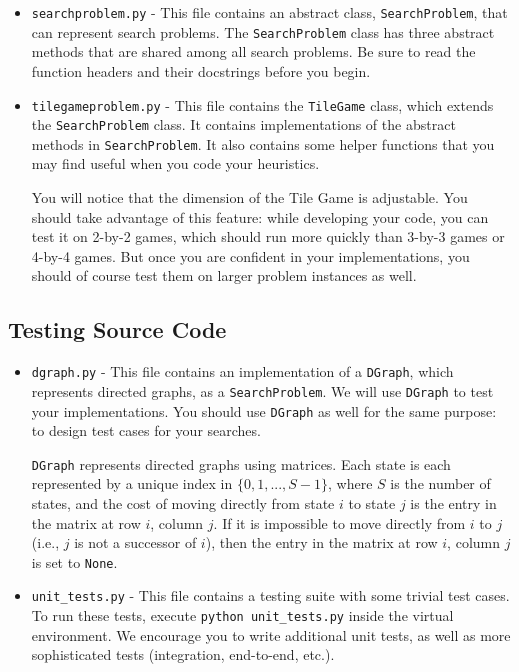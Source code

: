 \documentclass{article}
\begin{document}
\begin{itemize}

\item \verb|searchproblem.py| - This file contains an abstract class, \verb|SearchProblem|,
  that can represent search problems.
  The \verb|SearchProblem| class has three abstract methods that are shared among all search problems.
  Be sure to read the function headers and their docstrings before you begin.

\item \verb|tilegameproblem.py| - This file contains the \verb|TileGame| class, which extends the \verb|SearchProblem| class.
  It contains implementations of the abstract methods in \verb|SearchProblem|.
  It also contains some helper functions that you may find useful when you code your heuristics.
   
  You will notice that the dimension of the Tile Game is adjustable.
  You should take advantage of this feature: while developing your
  code, you can test it on 2-by-2 games, which should run more quickly
  than 3-by-3 games or 4-by-4 games.  But once you are confident in
  your implementations, you should of course test them on larger
  problem instances as well.

\end{itemize}


\subsection{Testing Source Code}

\begin{itemize}

\item \verb|dgraph.py| - This file contains an implementation of a \verb|DGraph|,
  which represents directed graphs, as a \verb|SearchProblem|.
  We will use \verb|DGraph| to test your implementations.
  You should use \verb|DGraph| as well for the same purpose: to design test cases for your searches.
  
  \verb|DGraph| represents directed graphs using matrices.
  Each state is each represented by a unique index in $\{ 0, 1, ..., S-1 \}$,
  where $S$ is the number of states,
  and the cost of moving directly from state $i$ to state $j$ is the entry in the matrix at row $i$, column $j$.
  If it is impossible to move directly from $i$ to $j$ (i.e., $j$ is not a successor of $i$),
  then the entry in the matrix at row $i$, column $j$ is set to \verb|None|.

\item \verb|unit_tests.py| - This file contains a testing suite with some trivial test cases.
  To run these tests, execute \verb|python unit_tests.py| inside the virtual environment.
  We encourage you to write additional unit tests, as well as more sophisticated tests
  (integration, end-to-end, etc.).

\end{itemize}
\end{document}
